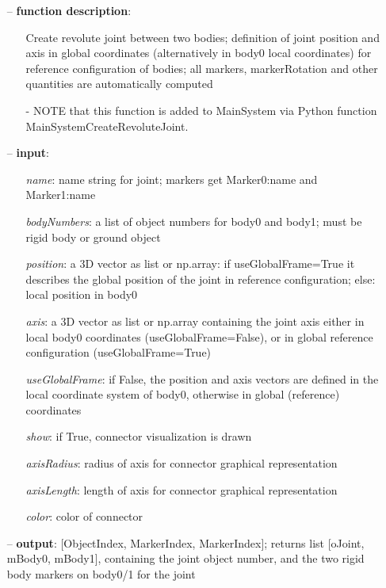 \begin{itemize}[leftmargin=0.7cm]
\item[--]
{\bf function description}: \vspace{-6pt}
\begin{itemize}[leftmargin=1.2cm]
\setlength{\itemindent}{-0.7cm}
\item[]Create revolute joint between two bodies; definition of joint position and axis in global coordinates (alternatively in body0 local coordinates) for reference configuration of bodies; all markers, markerRotation and other quantities are automatically computed
\item[]- NOTE that this function is added to MainSystem via Python function MainSystemCreateRevoluteJoint.
\end{itemize}
\item[--]
{\bf input}: \vspace{-6pt}
\begin{itemize}[leftmargin=1.2cm]
\setlength{\itemindent}{-0.7cm}
\item[]{\it name}: name string for joint; markers get Marker0:name and Marker1:name
\item[]{\it bodyNumbers}: a list of object numbers for body0 and body1; must be rigid body or ground object
\item[]{\it position}: a 3D vector as list or np.array: if useGlobalFrame=True it describes the global position of the joint in reference configuration; else: local position in body0
\item[]{\it axis}: a 3D vector as list or np.array containing the joint axis either in local body0 coordinates (useGlobalFrame=False), or in global reference configuration (useGlobalFrame=True)
\item[]{\it useGlobalFrame}: if False, the position and axis vectors are defined in the local coordinate system of body0, otherwise in global (reference) coordinates
\item[]{\it show}: if True, connector visualization is drawn
\item[]{\it axisRadius}: radius of axis for connector graphical representation
\item[]{\it axisLength}: length of axis for connector graphical representation
\item[]{\it color}: color of connector
\end{itemize}
\item[--]
{\bf output}: [ObjectIndex, MarkerIndex, MarkerIndex]; returns list [oJoint, mBody0, mBody1], containing the joint object number, and the two rigid body markers on body0/1 for the joint

\end{itemize}
